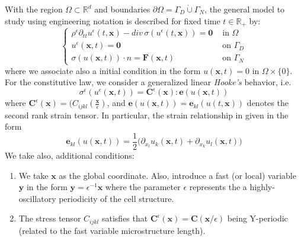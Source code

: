 With the region $\Omega \subset \mathbb{R}^d$ and boundaries $\partial \Omega = \Gamma_D \dot\cup \Gamma_N$, the general model to study using engineering notation is described for fixed time $t \in \mathbb{R}_+$ by:
\begin{equation}
    \label{VectorPDE-Elasticity}
    \left \{ 
    \begin{array}{cc}
        \rho^{\epsilon}\partial_{tt} u^{\epsilon}(t,\mathbf{x}) - div \, \sigma(u^{\epsilon}(t,\mathbf{x})) = \mathbf{0} & \text{ in } \Omega \\
        u^{\epsilon}(\mathbf{x}, t) = \mathbf{0} & \text{ on } \Gamma_D\\
        \sigma(u(\mathbf{x},t)) \cdot n = \mathbf{F}(\mathbf{x},t) & \text{ on } \Gamma_N
    \end{array}
    \right .
\end{equation}
where we associate also a initial condition in the form $u(\mathbf{x}, t) = 0 \text{ in } \Omega \times \{0\}$. For the constitutive law, we consider a generalized linear \textit{Hooke's} behavior, i.e.
\begin{equation}
    \label{ConstituteEq}
    \sigma^{\epsilon}(u^{\epsilon}(\mathbf{x}, t)) = \mathbf{C}^{\epsilon}(\mathbf{x}) : \mathbf{e}(u(\mathbf{x},t))
\end{equation}
where $\mathbf{C}^{\epsilon}(\mathbf{x}) = (C_{ijkl}(\frac{\mathbf{x}}{\epsilon})$, and $\mathbf{e}(u(\mathbf{x},t)) = \mathbf{e}_{kl}(u(t, \mathbf{x}))$ denotes the second rank strain tensor. In particular, the strain relationship in given in the form
\begin{equation}
    \label{StrainEq}
    \mathbf{e}_{kl} (u(\mathbf{x},t)) = \frac{1}{2}\big( \partial_{x_l} u_k(\mathbf{x},t) + \partial_{x_k} u_l (\mathbf{x},t) \big)
\end{equation}
We take also, additional conditions:
\begin{enumerate}
    \item We take $\mathbf{x}$ as the global coordinate. Also, introduce a fast (or local) variable $\mathbf{y}$ in the form $\mathbf{y} = \epsilon^{-1}\mathbf{x}$ where the parameter $\epsilon$ represents the a highly-oscillatory periodicity of the cell structure.
    \item The stress tensor $C_{ijkl}$ satisfies that $\mathbf{C}^{\epsilon} (\mathbf{x}) = \mathbf{C}(\mathbf{x}/\epsilon)$ being Y-periodic (related to the fast variable microstructure length).
\end{enumerate}

